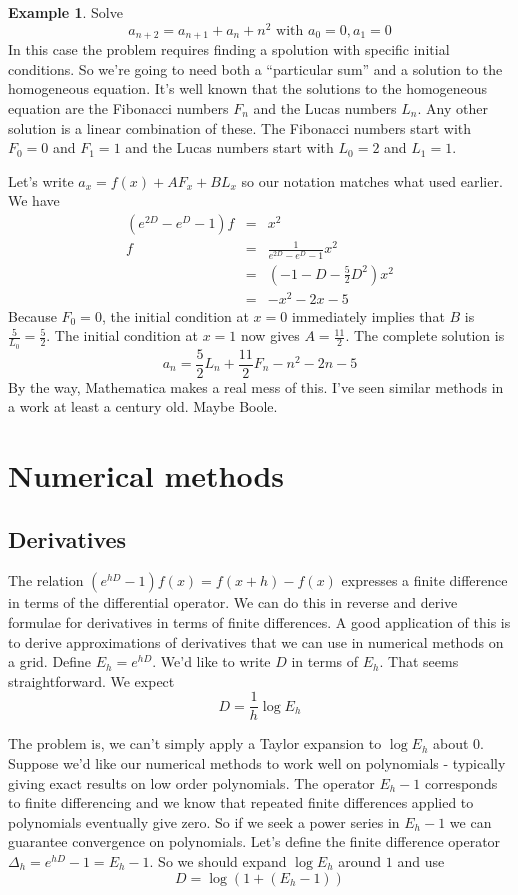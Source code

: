 \documentclass[a4paper]{article}
\theoremstyle{definition}
\newtheorem{example}{Example}[section]
\begin{document}
\begin{example}
Solve
\[
a_{n+2}=a_{n+1}+a_n+n^2 \mbox{ with } a_0=0, a_1=0
\]
In this case the problem requires finding a spolution with specific initial conditions.
So we're going to need both a ``particular sum'' and a solution to the homogeneous equation.
It's well known that the solutions to the homogeneous equation are the Fibonacci numbers $F_n$ and the Lucas numbers $L_n$.
Any other solution is a linear combination of these.
The Fibonacci numbers start with $F_0=0$ and $F_1=1$ and the Lucas numbers start with $L_0=2$ and $L_1=1$.

Let's write $a_x=f(x)+AF_x+BL_x$ so our notation matches what used earlier.
We have
\begin{eqnarray*}
(e^{2D}-e^D-1)f & = & x^2 \\
f & = & \frac{1}{e^{2D}-e^D-1}x^2 \\
  & = & (-1-D-\frac{5}{2}D^2)x^2 \\
  & = & -x^2-2x-5
\end{eqnarray*}
Because $F_0=0$, the initial condition at $x=0$ immediately implies that $B$ is $\frac{5}{L_0}=\frac{5}{2}$.
The initial condition at $x=1$ now gives $A=\frac{11}{2}$.
The complete solution is
\[
a_n = \frac{5}{2}L_n+\frac{11}{2}F_n-n^2-2n-5
\]
By the way, Mathematica makes a real mess of this.
I've seen similar methods in a work at least a century old.
Maybe Boole.
\end{example}

\section{Numerical methods}
\subsection{Derivatives}
The relation $(e^{hD}-1)f(x) = f(x+h)-f(x)$ expresses a finite difference in terms of the differential operator.
We can do this in reverse and derive formulae for derivatives in terms of finite differences.
A good application of this is to derive approximations of derivatives that we can use in numerical methods on a grid.
Define $E_h = e^{hD}$. We'd like to write $D$ in terms of $E_h$.
That seems straightforward. We expect
\[
D=\frac{1}{h}\log E_h
\]

The problem is, we can't simply apply a Taylor expansion to $\log E_h$ about $0$.
Suppose we'd like our numerical methods to work well on polynomials - typically giving exact results on low order polynomials.
The operator $E_h-1$ corresponds to finite differencing and we know that repeated finite differences applied to polynomials eventually give zero.
So if we seek a power series in $E_h-1$ we can guarantee convergence on polynomials.
Let's define the finite difference operator $\Delta_h = e^{hD}-1 = E_h-1$.
So we should expand $\log E_h$ around $1$ and use
\[
D = \log(1+(E_h-1))
\]
\end{document}
